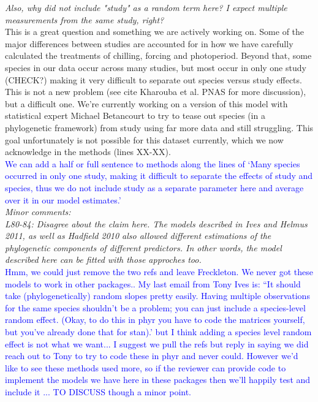 \documentclass[11pt]{article}
\begin{document}
\emph{Also, why did not include "study" as a random term here? I expect multiple measurements from the same study, right?}\\

This is a great question and something we are actively working on. Some of the major differences between studies are accounted for in how we have carefully calculated the treatments of chilling, forcing and photoperiod. Beyond that, some species in our data occur across many studies, but most occur in only one study (CHECK?) making it very difficult to separate out species versus study effects. This is not a new problem (see cite Kharouba et al. PNAS for more discussion), but a difficult one. We're currently working on a version of this model with statistical expert Michael Betancourt to try to tease out species (in a phylogenetic framework) from study using far more data and still struggling. This goal unfortunately is not possible for this dataset currently, which we now acknowledge in the methods (lines XX-XX). \\

\textcolor{blue}{We can add a half or full sentence to methods along the lines of `Many species occurred in only one study, making it difficult to separate the effects of study and species, thus we do not include study as a separate parameter here and average over it in our model estimates.' }\\


\emph{Minor comments:}\\
\emph{L80-84: Disagree about the claim here. The models described in Ives and Helmus 2011, as well as Hadfield 2010 also allowed different estimations of the phylogenetic components of different predictors. In other words, the model described here can be fitted with those approches too.}\\

\textcolor{blue}{Hmm, we could just remove the two refs and leave Freckleton. We never got these models to work in other packages.. My last email from Tony Ives is: ``It
should take (phylogenetically) random slopes pretty easily. Having multiple observations for
the same species shouldn't be a problem; you can just include a species-level random effect.
(Okay, to do this in phyr you have to code the matrices yourself, but you've already done
that for stan).' but I think adding a species level random effect is not what we want... I suggest we pull the refs but reply in saying we did reach out to Tony to try to code these in phyr and never could. However we'd like to see these methods used more, so if the reviewer can provide code to implement the models we have here in these packages then we'll happily test and include it ... TO DISCUSS though a minor point.}\\
\end{document}
